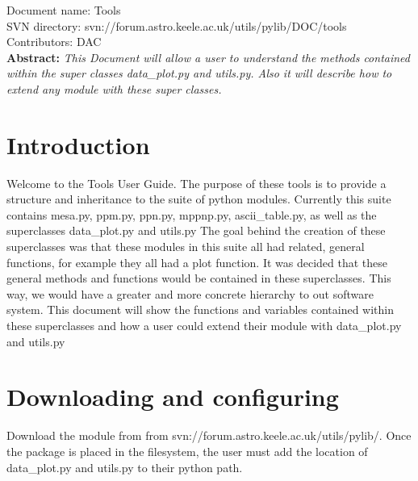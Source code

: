 \renewcommand{\ndoctitle}{data\_plot.py and utils.py: A guide to using these superclasses} 
\renewcommand{\ndocname}{Tools}                      
\renewcommand{\svndir}{svn://forum.astro.keele.ac.uk/utils/pylib/DOC/tools}  
\renewcommand{\ndoccontribs}{DAC}



Document name: \ndocname \\
SVN directory: \svndir\\
Contributors: \ndoccontribs\\



{\textbf{Abstract:} \slshape
This Document will allow a user to understand the methods contained within the super classes
data\_plot.py and utils.py.  Also it will describe how to extend any module with 
these super classes.
}

\section{Introduction}
Welcome to the Tools User Guide.  The purpose of these tools is to provide a structure and inheritance to 
the suite of python modules. Currently this suite contains mesa.py, ppm.py, ppn.py, mppnp.py, ascii\_table.py, as well as the superclasses data\_plot.py and utils.py
The goal behind the creation of these superclasses was that these modules in this suite all had related, general functions, for example they all had a plot function.
It was decided that these general methods and functions would be contained in these superclasses.
This way, we would have a greater and more concrete hierarchy to out software system.
This document will show the functions and variables contained within these superclasses and how a user could extend their module with data\_plot.py and utils.py

\section{Downloading and configuring}
Download the module from from svn://forum.astro.keele.ac.uk/utils/pylib/.   Once the package is placed in the filesystem, the user must add the location
of data\_plot.py and utils.py to their python path.

